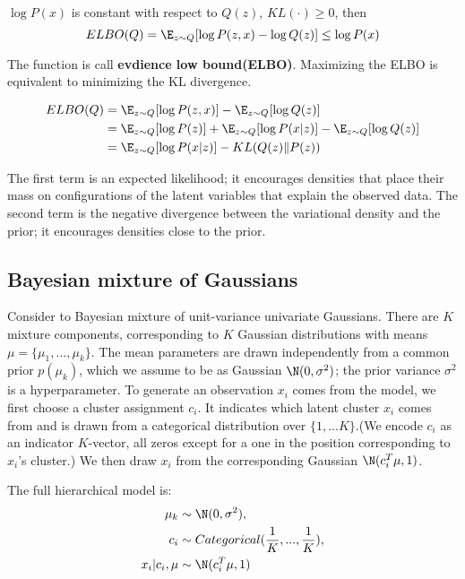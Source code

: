 $\log P(x)$ is constant with respect to $Q(z)$, $KL(\cdot ) \ge 0$, then
\begin{equation}
    ELBO(Q) = \E_{z \sim Q} [\log P(z, x) - \log Q(z)] \le \log P(x)
\end{equation}

The function is call \textbf{evdience low bound(ELBO)}. Maximizing the ELBO is equivalent to
minimizing the KL divergence.

\begin{equation}
    \begin{split}
        ELBO(Q)
        &= \E_{z \sim Q} [\log P(z, x)] - \E_{z \sim Q} [\log Q(z)] \\
        &= \E_{z \sim Q} [\log P(z)] + \E_{z \sim Q} [\log P(x|z)] - \E_{z \sim Q} [\log Q(z)] \\
        &= \E_{z \sim Q} [\log P(x|z)] - KL(Q(z)\|P(z))
    \end{split}
\end{equation}

The first term is an expected likelihood; it encourages densities
that place their mass on configurations of the latent variables
that explain the observed data. The second term is the negative
divergence between the variational density and the prior; it encourages
densities close to the prior.

\subsection{Bayesian mixture of Gaussians}
Consider to Bayesian mixture of unit-variance univariate Gaussians. There are $K$ mixture components, corresponding to $K$ Gaussian
distributions with means $\mu = \{\mu_1,...,\mu_k\}$. The mean parameters are drawn independently from a common prior $p(\mu_k)$, which
we assume to be as Gaussian $\N(0, \sigma^2)$; the prior variance $\sigma^2$ is a hyperparameter. To generate an observation $x_i$ comes
from the model, we first choose a cluster assignment $c_i$. It indicates which latent cluster $x_i$ comes from and is drawn from a categorical
distribution over $\{1,...K\}$.(We encode $c_i$ as an indicator $K$-vector, all zeros except for a one in the position corresponding to $x_i$'s cluster.)
We then draw $x_i$ from the corresponding Gaussian $\N(c_i^T\mu, 1)$.

The full hierarchical model is:
\begin{equation}
    \begin{split}
        \mu_k &\sim \N(0, \sigma^2), \\
        c_i &\sim Categorical(\frac{1}{K}, ..., \frac{1}{K}), \\
        x_i|c_i, \mu &\sim \N(c_i^T\mu, 1)
    \end{split}
\end{equation}
